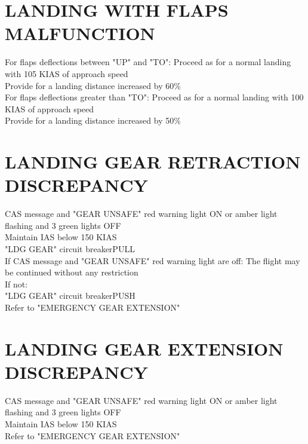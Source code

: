 \documentclass{article}
\newcommand{\warning}[1]{\colorbox{Black}{\color{Orange}{#1}}}
\begin{document}
\begin{multicols*}{2}
\section*{LANDING WITH FLAPS MALFUNCTION}
For flaps deflections between "UP" and "TO":
\hspace*{6mm} Proceed as for a normal landing with 105 KIAS of approach speed\\
\hspace*{6mm} Provide for a landing distance increased by 60\%\\
For flaps deflections greater than "TO":
\hspace*{6mm} Proceed as for a normal landing with 100 KIAS of approach speed\\
\hspace*{6mm} Provide for a landing distance increased by 50\%
\section*{LANDING GEAR RETRACTION DISCREPANCY}
\warning{GEAR UNSAFE} CAS message and "GEAR UNSAFE" red warning light ON or amber light flashing and 3 green lights OFF\\
Maintain IAS below 150 KIAS\\
"LDG GEAR" circuit breaker\dotfill PULL\\
If \warning{GEAR UNSAFE} CAS message and "GEAR UNSAFE" red warning light are off:
\hspace*{6mm} The flight may be continued without any restriction\\
If not:\\
\hspace*{6mm} "LDG GEAR" circuit breaker\dotfill PUSH\\
Refer to "EMERGENCY GEAR EXTENSION"
\section*{LANDING GEAR EXTENSION DISCREPANCY}
\warning{GEAR UNSAFE} CAS message and "GEAR UNSAFE" red warning light ON or amber light flashing and 3 green lights OFF\\
Maintain IAS below 150 KIAS\\
Refer to "EMERGENCY GEAR EXTENSION"
\vfill\null

\end{multicols*}
\end{document}
